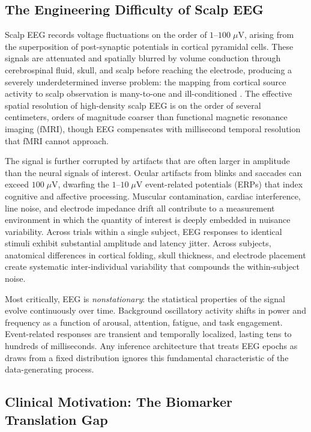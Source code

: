\subsection{The Engineering Difficulty of Scalp EEG}

Scalp EEG records voltage fluctuations on the order of $1$--$100\;\mu$V, arising from the superposition of post-synaptic potentials in cortical pyramidal cells. These signals are attenuated and spatially blurred by volume conduction through cerebrospinal fluid, skull, and scalp before reaching the electrode, producing a severely underdetermined inverse problem: the mapping from cortical source activity to scalp observation is many-to-one and ill-conditioned \cite{nunez_srinivasan_2006}. The effective spatial resolution of high-density scalp EEG is on the order of several centimeters, orders of magnitude coarser than functional magnetic resonance imaging (fMRI), though EEG compensates with millisecond temporal resolution that fMRI cannot approach.

The signal is further corrupted by artifacts that are often larger in amplitude than the neural signals of interest. Ocular artifacts from blinks and saccades can exceed $100\;\mu$V, dwarfing the $1$--$10\;\mu$V event-related potentials (ERPs) that index cognitive and affective processing. Muscular contamination, cardiac interference, line noise, and electrode impedance drift all contribute to a measurement environment in which the quantity of interest is deeply embedded in nuisance variability. Across trials within a single subject, EEG responses to identical stimuli exhibit substantial amplitude and latency jitter. Across subjects, anatomical differences in cortical folding, skull thickness, and electrode placement create systematic inter-individual variability that compounds the within-subject noise.

Most critically, EEG is \emph{nonstationary}: the statistical properties of the signal evolve continuously over time. Background oscillatory activity shifts in power and frequency as a function of arousal, attention, fatigue, and task engagement. Event-related responses are transient and temporally localized, lasting tens to hundreds of milliseconds. Any inference architecture that treats EEG epochs as draws from a fixed distribution ignores this fundamental characteristic of the data-generating process.

\subsection{Clinical Motivation: The Biomarker Translation Gap}

